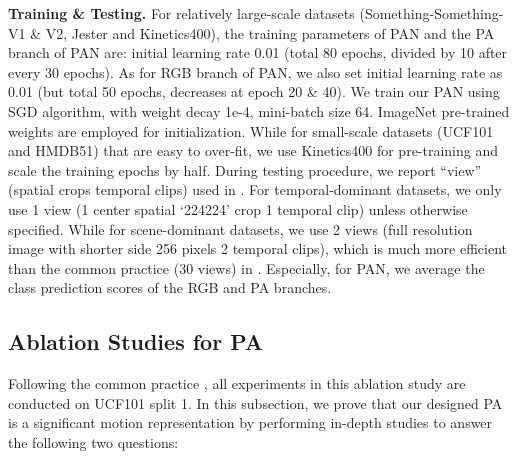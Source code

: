 \documentclass[journal]{IEEEtran}
\begin{document}
\textbf{Training \& Testing.} For relatively large-scale datasets (Something-Something-V1 \& V2, Jester and Kinetics400), the training parameters of PAN and the PA branch of PAN are: initial learning rate 0.01 (total 80 epochs, divided by 10 after every 30 epochs). As for RGB branch of PAN, we also set initial learning rate as 0.01 (but total 50 epochs, decreases at epoch 20 \& 40). We train our PAN using SGD algorithm, with weight decay 1e-4, mini-batch size 64. ImageNet pre-trained weights are employed for initialization. While for small-scale datasets (UCF101 and HMDB51) that are easy to over-fit, we use Kinetics400 for pre-training and scale the training epochs by half. During testing procedure, we report ``view'' (spatial crops  temporal clips) used in \cite{Feichtenhofer2019SlowFastNF}. For temporal-dominant datasets, we only use 1 view (1 center spatial `224224' crop  1 temporal clip) unless otherwise specified. While for scene-dominant datasets, we use 2 views (full resolution image with shorter side 256 pixels  2 temporal clips), which is much more efficient than the common practice (30 views) in \cite{Wang_2018_CVPR,Feichtenhofer2019SlowFastNF,Li_2020_CVPR}. Especially, for PAN, we average the class prediction scores of the RGB and PA branches.




\subsection{Ablation Studies for PA} \label{section:PA_ablation}

Following the common practice \cite{wang2016temporal,feichtenhofer2016convolutional,tran2017convnet}, all experiments in this ablation study are conducted on UCF101 split 1. In this subsection, we prove that our designed PA is a significant motion representation by performing in-depth studies to answer the following two questions:
\end{document}
